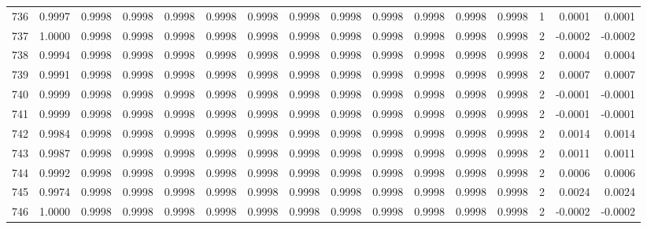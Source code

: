 \begin{tabular}{lrrrrrrrrrrrrrrr}
736 &      0.9997 &  0.9998 &  0.9998 &  0.9998 &  0.9998 &  0.9998 &  0.9998 &  0.9998 &  0.9998 &  0.9998 &   0.9998 &     0.9998 &      1 &                    0.0001 &                     0.0001 \\
737 &      1.0000 &  0.9998 &  0.9998 &  0.9998 &  0.9998 &  0.9998 &  0.9998 &  0.9998 &  0.9998 &  0.9998 &   0.9998 &     0.9998 &      2 &                   -0.0002 &                    -0.0002 \\
738 &      0.9994 &  0.9998 &  0.9998 &  0.9998 &  0.9998 &  0.9998 &  0.9998 &  0.9998 &  0.9998 &  0.9998 &   0.9998 &     0.9998 &      2 &                    0.0004 &                     0.0004 \\
739 &      0.9991 &  0.9998 &  0.9998 &  0.9998 &  0.9998 &  0.9998 &  0.9998 &  0.9998 &  0.9998 &  0.9998 &   0.9998 &     0.9998 &      2 &                    0.0007 &                     0.0007 \\
740 &      0.9999 &  0.9998 &  0.9998 &  0.9998 &  0.9998 &  0.9998 &  0.9998 &  0.9998 &  0.9998 &  0.9998 &   0.9998 &     0.9998 &      2 &                   -0.0001 &                    -0.0001 \\
741 &      0.9999 &  0.9998 &  0.9998 &  0.9998 &  0.9998 &  0.9998 &  0.9998 &  0.9998 &  0.9998 &  0.9998 &   0.9998 &     0.9998 &      2 &                   -0.0001 &                    -0.0001 \\
742 &      0.9984 &  0.9998 &  0.9998 &  0.9998 &  0.9998 &  0.9998 &  0.9998 &  0.9998 &  0.9998 &  0.9998 &   0.9998 &     0.9998 &      2 &                    0.0014 &                     0.0014 \\
743 &      0.9987 &  0.9998 &  0.9998 &  0.9998 &  0.9998 &  0.9998 &  0.9998 &  0.9998 &  0.9998 &  0.9998 &   0.9998 &     0.9998 &      2 &                    0.0011 &                     0.0011 \\
744 &      0.9992 &  0.9998 &  0.9998 &  0.9998 &  0.9998 &  0.9998 &  0.9998 &  0.9998 &  0.9998 &  0.9998 &   0.9998 &     0.9998 &      2 &                    0.0006 &                     0.0006 \\
745 &      0.9974 &  0.9998 &  0.9998 &  0.9998 &  0.9998 &  0.9998 &  0.9998 &  0.9998 &  0.9998 &  0.9998 &   0.9998 &     0.9998 &      2 &                    0.0024 &                     0.0024 \\
746 &      1.0000 &  0.9998 &  0.9998 &  0.9998 &  0.9998 &  0.9998 &  0.9998 &  0.9998 &  0.9998 &  0.9998 &   0.9998 &     0.9998 &      2 &                   -0.0002 &                    -0.0002 \\

\end{tabular}
